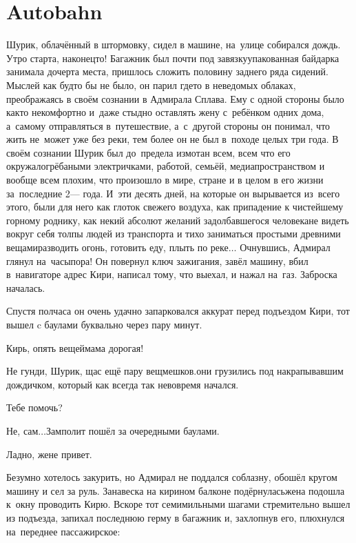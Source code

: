 \chapter{Autobahn}
\vepsianrose

Шурик, облачённый в штормовку, сидел в машине, на~улице собирался дождь. Утро старта, наконец\sdash то! Багажник был почти под завязку\mdash упакованная байдарка занимала дочерта места, пришлось сложить половину заднего ряда сидений. Мыслей как будто бы не было, он парил где\sdash то в неведомых облаках, преображаясь в своём сознании в Адмирала Сплава. Ему с одной стороны было как\sdash то некомфортно и~даже стыдно оставлять жену с~ребёнком одних дома, а~самому отправляться в~путешествие, а~с~другой стороны он понимал, что жить не~может уже без реки, тем более он не был в~походе целых три года. В своём сознании Шурик был до~предела измотан всем, всем что его окружало\mdash грёбаными электричками, работой, семьёй, медиапространством и вообще всем плохим, что произошло в мире, стране и в целом в его жизни за~последние 2\thinspace\nobreakdash--- года. И~эти десять дней, на которые он вырывается из~всего этого, были для него как глоток свежего воздуха, как припадение к чистейшему горному роднику, как некий абсолют желаний задолбавшегося человека\mdash не видеть вокруг себя толпы людей из транспорта и тихо заниматься простыми древними вещами\mdash разводить огонь, готовить еду, плыть по реке$\ldots$ Очнувшись, Адмирал глянул на~часы\mdash пора! Он повернул ключ зажигания, завёл машину, вбил в~навигаторе адрес Кири, написал тому, что выехал, и нажал на~газ. Заброска началась.

Спустя полчаса он очень удачно запарковался аккурат перед подъездом Кири, тот вышел c баулами буквально через пару минут.

\diagdash Кирь, опять вещей\mdash мама дорогая!

\diagdash Не гунди, Шурик, щас ещё пару вещмешков.\mdash они грузились под накрапывавшим дождичком, который как всегда так невовремя начался.

\diagdash Тебе помочь?

\diagdash Не, сам$\ldots$\mdash Замполит пошёл за очередными баулами.

\diagdash Ладно, жене привет.

Безумно хотелось закурить, но Адмирал не поддался соблазну, обошёл кругом машину и сел за руль. Занавеска на кирином балконе подёрнулась\mdash жена подошла к~окну проводить Кирю. Вскоре тот семимильными шагами стремительно вышел из подъезда, запихал последнюю герму в багажник и, захлопнув его, плюхнулся на~переднее пассажирское:

